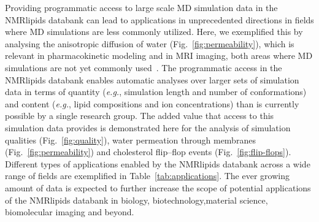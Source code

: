 \documentclass[fleqn,10pt]{wlscirep}
\begin{document}
Providing programmatic access to large scale MD simulation data in the NMRlipids databank can lead to applications in unprecedented directions in fields where MD simulations are less commonly utilized. Here, we exemplified this by analysing the anisotropic diffusion of water (Fig.~\ref{fig:permeability}), which is relevant in pharmacokinetic modeling and in MRI imaging, both areas where MD simulations are not yet commonly used~\cite{nitsche19,topgaard20}. 
The programmatic access in the NMRlipids databank enables automatic analyses over larger sets of simulation data in terms of quantity (\textit{e.g.}, simulation length and number of conformations) and content (\textit{e.g.}, lipid compositions and ion concentrations) than is currently possible by a single research group. The added value that access to this simulation data provides is demonstrated here for the analysis of simulation qualities (Fig.~\ref{fig:quality}), water permeation through membranes (Fig.~\ref{fig:permeability}) and cholesterol flip--flop events (Fig.~\ref{fig:flip-flops}). 
Different types of applications enabled by the NMRlipids databank across a wide range of fields are exemplified in Table~\ref{tab:applications}. The ever growing amount of data is expected to further increase the scope of potential applications of the NMRlipids databank in biology, biotechnology,material science, biomolecular imaging and beyond. 
\end{document}
